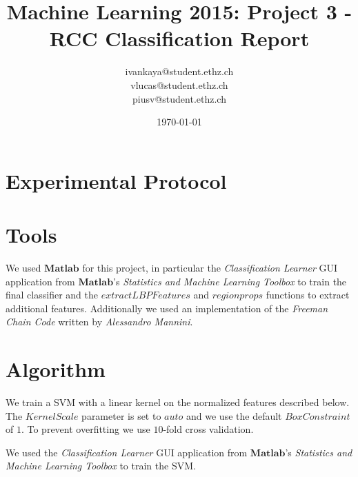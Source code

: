 \documentclass[a4paper, 11pt]{article}
\title{Machine Learning 2015: Project 3 - RCC Classification Report}
\author{ivankaya@student.ethz.ch\\vlucas@student.ethz.ch\\ piusv@student.ethz.ch\\}
\date{\today}
\begin{document}
\maketitle

\section*{Experimental Protocol}

\section{Tools}

We used $\mathbf{Matlab}$ for this project, in particular the \textit{Classification Learner}
GUI application from $\mathbf{Matlab}$'s \textit{Statistics and Machine Learning Toolbox}
to train the final classifier and the $extractLBPFeatures$ and $regionprops$ functions
to extract additional features. Additionally we used an implementation of the 
\textit{Freeman Chain Code} written by \textit{Alessandro Mannini}.

\section{Algorithm}

We train a SVM with a linear kernel on the normalized features described below.
The $KernelScale$ parameter is set to $auto$ and we use the default $BoxConstraint$
of $1$. To prevent overfitting we use $10$-fold cross validation.

We used the \textit{Classification Learner} GUI application from $\mathbf{Matlab}$'s
\textit{Statistics and Machine Learning Toolbox} to train the SVM.
\end{document}
